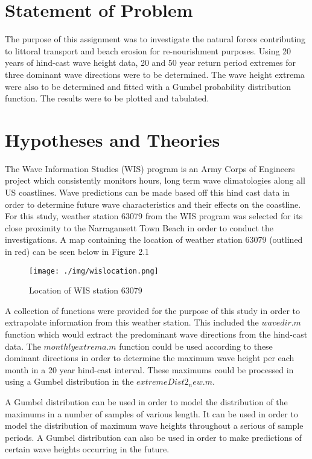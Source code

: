\section{Statement of Problem}

The purpose of this assignment was to investigate the natural forces contributing to littoral transport and beach erosion for re-nourishment purposes. Using 20 years of hind-cast wave height data, 20 and 50 year return period extremes for three dominant wave directions were to be determined. The wave height extrema were also to be determined and fitted with a Gumbel probability distribution function. The results were to be plotted and tabulated.

\section{Hypotheses and Theories}

The Wave Information Studies (WIS) program is an Army Corps of Engineers project which consistently monitors hours, long term wave climatologies along all US coastlines. Wave predictions can be made based off this hind cast data in order to determine future wave characteristics and their effects on the coastline. For this study, weather station 63079 from the WIS program was selected for its close proximity to the Narragansett Town Beach in order to conduct the investigations. A map containing the location of weather station 63079 (outlined in red) can be seen below in Figure 2.1

\begin{figure}[H]
	\centering
	\texttt{[image: ./img/wislocation.png]}
	\label{fig:wis1}
	\caption{Location of WIS station 63079}
\end{figure}

A collection of functions were provided for the purpose of this study in order to extrapolate information from this weather station. This included the $wavedir.m$ function which would extract the predominant wave directions from the hind-cast data. The $monthlyextrema.m$ function could be used according to these dominant directions in order to determine the maximum wave height per each month in a 20 year hind-cast interval. These maximums could be processed in using a Gumbel distribution in the $extremeDist2_new.m$.

A Gumbel distribution can be used in order to model the distribution of the maximums in a number of samples of various length. It can be used in order to model the distribution of maximum wave heights throughout a serious of sample periods. A Gumbel distribution can also be used in order to make predictions of certain wave heights occurring in the future.  

